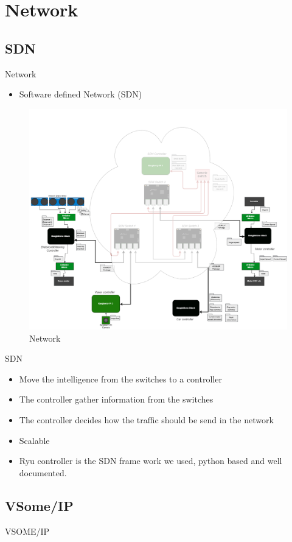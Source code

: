 \documentclass{beamer}
\begin{document}

\section{Network}
\subsection{SDN}
\begin{frame}{Network}
    \begin{itemize}
        \item Software defined Network (SDN)
    \end{itemize}
    \begin{figure}
        \includegraphics[width=0.6\linewidth]{network.png}
        \caption{Network}
    \end{figure}
\end{frame}



\begin{frame}{SDN}
    \begin{itemize}
        \item Move the intelligence from the switches to a controller
        \item The controller gather information from the switches
        \item The controller decides how the traffic should be send in the network
        \item Scalable
        \item Ryu controller is the SDN frame work we used, python based and well documented.          
    \end{itemize}
    
\end{frame}{}

\subsection{VSome/IP}
\begin{frame}{VSOME/IP}
    
\end{frame}
\end{document}
